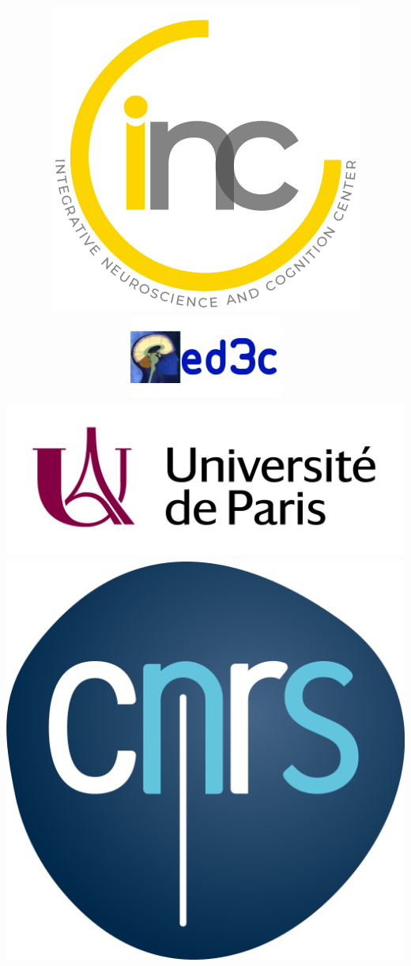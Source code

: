 \documentclass[11pt]{beamer}
\begin{document}
\title{\includegraphics[scale=0.10]{logoincc.jpg}  \includegraphics[scale=0.3]{ed3c.png} \includegraphics[scale=0.05]{logouniv.jpg}  \includegraphics[scale=0.03]{logocnrs.png} \\
      
}
\end{document}
